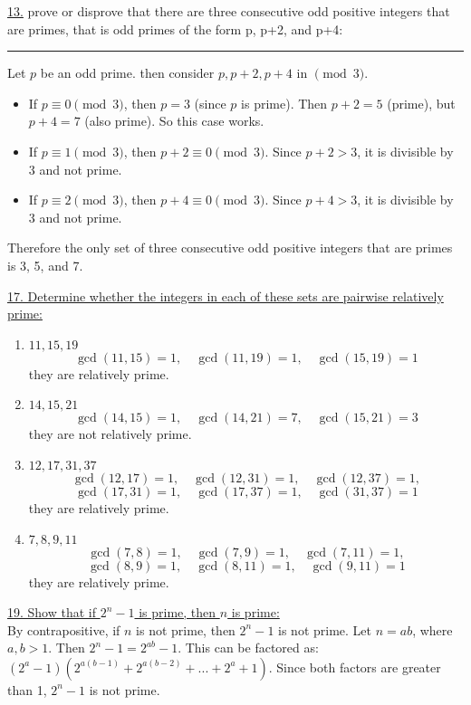 \documentclass[12pt]{article}
\begin{document}
\vspace{3.3mm}
\noindent\underline{13.} prove or disprove that there are three consecutive odd positive integers that are primes, that is odd primes of  the form p, p+2, and p+4:
\rule{\linewidth}{0.5pt}
\indent Let $p$ be an odd prime. then consider $p, p+2, p+4$ in $\pmod{3}$.
\begin{itemize}
    \item If $p \equiv 0 \pmod{3}$, then $p=3$ (since $p$ is prime). Then $p+2=5$ (prime), but $p+4=7$ (also prime). So this case works.
    \item If $p \equiv 1 \pmod{3}$, then $p+2 \equiv 0 \pmod{3}$. Since $p+2 > 3$, it is divisible by 3 and not prime.
    \item If $p \equiv 2 \pmod{3}$, then $p+4 \equiv 0 \pmod{3}$. Since $p+4 > 3$, it is divisible by 3 and not prime.
\end{itemize}
Therefore the only set of three consecutive odd positive integers that are primes is 3, 5, and 7.

\newpage
\noindent\underline{17. Determine whether the integers in each of these sets are pairwise relatively prime:}
\begin{enumerate}[label=(\alph*)]
    \item $11, 15 ,19$
    \[
    \gcd(11, 15) = 1, \quad \gcd(11, 19) = 1, \quad \gcd(15, 19) = 1
    \]
    they are relatively prime.
    \item $14, 15 ,21$
    \[
    \gcd(14, 15) = 1, \quad \gcd(14, 21) = 7, \quad \gcd(15, 21) = 3
    \]
    they are not relatively prime.
    \item $12, 17, 31 ,37$
    \[
    \gcd(12, 17) = 1, \quad \gcd(12, 31) = 1, \quad \gcd(12, 37) = 1, \] 
    \[\gcd(17, 31) = 1, \quad \gcd(17, 37) = 1, \quad \gcd(31, 37) = 1\]
    they are relatively prime.
    \item $7, 8, 9, 11$
    \[
    \gcd(7, 8) = 1, \quad \gcd(7, 9) = 1, \quad \gcd(7, 11) = 1, \] 
    \[\gcd(8, 9) = 1, \quad \gcd(8, 11) = 1, \quad \gcd(9, 11) = 1\]
    they are relatively prime.
\end{enumerate}

\vspace{5mm}
\noindent\underline{19. Show that if $2^n-1$ is prime, then $n$ is prime:}
\\\indent By contrapositive, if $n$ is not prime, then $2^n-1$ is not prime. 
Let $n = ab$, where $a,b > 1$. Then $2^n -1 = 2^{ab} -1$.  This can be factored as: 
$(2^a-1)(2^{a(b-1)} + 2^{a(b-2)} + ... + 2^a + 1)$.
Since both factors are greater than 1, $2^n - 1$ is not prime.
\end{document}
